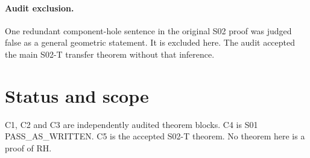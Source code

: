 \documentclass[11pt]{article}
\begin{document}
\paragraph{Audit exclusion.}
One redundant component-hole sentence in the original S02 proof was judged false as a general
geometric statement. It is excluded here. The audit accepted the main S02-T transfer theorem
without that inference.

\section*{Status and scope}
C1, C2 and C3 are independently audited theorem blocks. C4 is S01 PASS\_AS\_WRITTEN.
C5 is the accepted S02-T theorem. No theorem here is a proof of RH.
\end{document}
